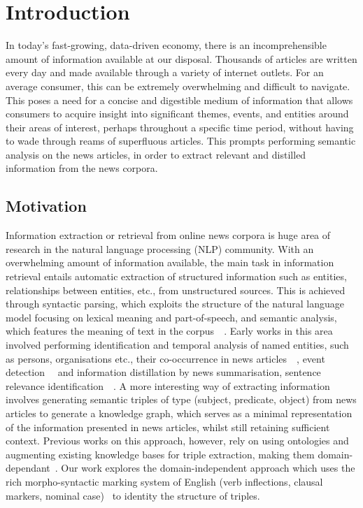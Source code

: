 \chapter{Introduction}
\vspace{-2ex}


In today's fast-growing, data-driven economy, there is an incomprehensible amount of information available at our disposal. Thousands of articles are written every day and made available through a variety of internet outlets. For an average consumer, this can be extremely overwhelming and difficult to navigate. This poses a need for a concise and digestible medium of information that allows consumers to acquire insight into significant themes, events, and entities around their areas of interest, perhaps throughout a specific time period, without having to wade through reams of superfluous articles. This prompts performing semantic analysis on the news articles, in order to extract relevant and distilled information from the news corpora. 

\section{Motivation}

Information extraction or retrieval from online news corpora is huge area of research in the natural language processing (NLP) community. With an overwhelming amount of information available, the main task in information retrieval entails automatic extraction of structured information such as entities, relationships between entities, etc., from unstructured sources. This is achieved through syntactic parsing, which exploits the structure of the natural language model focusing on lexical meaning and part-of-speech, and semantic analysis, which features the meaning of text in the corpus~\cite{global_ents_intro}~\cite{sarawagi_info}. Early works in this area involved performing identification and temporal analysis of named entities, such as persons, organisations etc., their co-occurrence in news articles~\cite{sarawagi_info}~\cite{intro_semntic_analysis_news}, event detection~\cite{finance}~\cite{finance_events} and information distillation by news summarisation, sentence relevance identification~\cite{news_info_extract}~\cite{summary_generation_intro}. A more interesting way of extracting information involves generating semantic triples of type (subject, predicate, object) from news articles to generate a knowledge graph, which serves as a minimal representation of the information presented in news articles, whilst still retaining sufficient context. Previous works on this approach, however, rely on using ontologies and augmenting existing knowledge bases for triple extraction, making them domain-dependant~\cite{wu2020knowledge}. Our work explores the domain-independent approach which uses the rich morpho-syntactic marking system of English (verb inflections, clausal markers, nominal case)~\cite{tseng2014chinese} to identity the structure of triples. 

